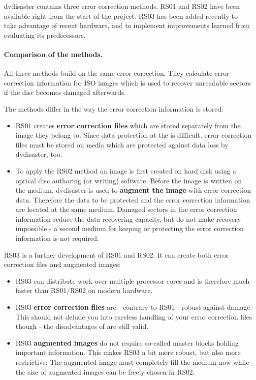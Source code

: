 dvdisaster contains three error correction methods.
RS01 and RS02 have been available right from the start of the project.
RS03 has been added recently to take advantage of 
recent hardware, and to implement improvements
learned from evaluating its predecessors.

\paragraph{Comparison of the methods.} All three methods build on the 
same  error correction. They calculate error 
correction information for ISO images which is used to recover unreadable sectors if 
the disc becomes damaged afterwards.

\smallskip

The methods differ in the way the error correction information is stored:

\begin{itemize}
\item  RS01 creates {\bf error correction files} which are stored separately 
from the image they belong to. Since data protection at 
the  is difficult, 
error correction files must be stored on media which are protected against data loss by dvdisaster, too.

\item To apply the RS02 method an image is first created on hard disk using a 
optical disc authoring (or writing) software. Before the image is written on the medium, 
dvdisaster is used to {\bf augment the image} with error correction data. 
Therefore the data to be protected and the error correction information are located at 
the same medium. Damaged sectors in the error correction information reduce the data recovering 
capacity, but do not make recovery impossible - a second medium for keeping or protecting the 
error correction information is not required.
\end{itemize}


RS03 is a further development of RS01 and RS02. 
It can create both error correction files and augmented images:

\begin{itemize}
\item RS03 can distribute work over multiple processor cores and is 
therefore much faster than RS01/RS02 on modern hardware.
\item RS03 {\bf error correction files} are - contrary to RS01 - robust 
against damage. This should not delude you into careless handling of your error 
correction files though - the disadvantages of  are 
still valid.
\item RS03 {\bf augmented images} do not require so-called master blocks 
holding important information. This makes RS03 a bit more robust, but also more restrictive: 
The augmented image must completely fill the medium now while the size of augmented images 
can be freely chosen in RS02.
\end{itemize}

